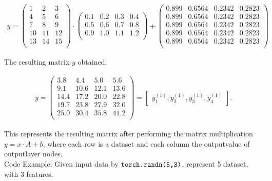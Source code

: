\begin{align}
y = \begin{pmatrix}
1 & 2 & 3 \\
4 & 5 & 6 \\
7 & 8 & 9 \\
10 & 11 & 12 \\
13 & 14 & 15 \\
\end{pmatrix} \cdot \begin{pmatrix}
0.1 & 0.2 & 0.3 & 0.4 \\
0.5 & 0.6 & 0.7 & 0.8 \\
0.9 & 1.0 & 1.1 & 1.2 \\
\end{pmatrix} + \begin{pmatrix}
	0.899 & 0.6564 & 0.2342 & 0.2823\\
	0.899 & 0.6564 & 0.2342 & 0.2823\\
	0.899 & 0.6564 & 0.2342 & 0.2823\\
	0.899 & 0.6564 & 0.2342 & 0.2823\\
	0.899 & 0.6564 & 0.2342 & 0.2823\\
\end{pmatrix}
\end{align}

The resulting matrix $y$ obtained:

\begin{align}
y = \begin{pmatrix}
3.8 & 4.4 & 5.0 & 5.6 \\
9.1 & 10.6 & 12.1 & 13.6 \\
14.4 & 17.2 & 20.0 & 22.8 \\
19.7 & 23.8 & 27.9 & 32.0 \\
25.0 & 30.4 & 35.8 & 41.2 \\
\end{pmatrix} = \begin{bmatrix}
    y^{(1)}_1, y^{(1)}_2,  y^{(1)}_3, y^{(1)}_4
\end{bmatrix}.
\end{align}

This represents the resulting matrix after performing the matrix multiplication $y = x \cdot A +b$, where each row is a dataset and each column the outputvalue of outputlayer nodes.\\



Code Example: Given input data by $\verb|torch.randn(5,3)|$, represent 5 dataset, with 3 features.\\

